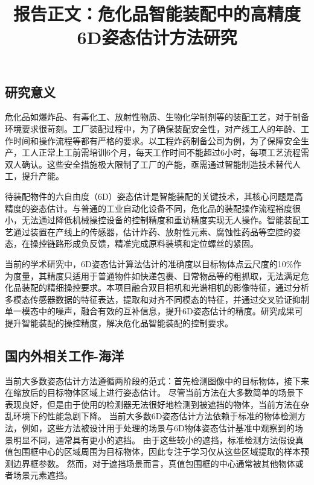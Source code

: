 \documentclass[12pt]{article}
\begin{document}

\title{报告正文：危化品智能装配中的高精度6D姿态估计方法研究}

\maketitle




\subsection{研究意义}

危化品如爆炸品、有毒化工、放射性物质、生物化学制剂等的装配工艺，对于制备环境要求很苛刻。工厂装配过程中，为了确保装配安全性，对产线工人的年龄、工作时间和操作流程等都有严格的要求。以工程炸药制备公司为例，为了保障安全生产，工人正常上工前需培训6个月，每天工作时间不能超过6小时，每项工艺流程需双人确认。这些安全措施极大限制了工厂的产能，亟需通过智能制造技术替代人工，提升产能。

待装配物件的六自由度（6D）姿态估计是智能装配的关键技术，其核心问题是高精度的姿态估计。与普通的工业自动化设备不同，危化品的装配操作流程裕度很小，无法通过降低机械操控设备的控制精度和重访精度实现无人操作。智能装配工艺通过装置在产线上的传感器，估计炸药、放射性元素、腐蚀性药品等空腔的姿态，在操控链路形成负反馈，精准完成原料装填和定位螺丝的紧固。

当前的学术研究中，6D姿态估计算法估计的准确度以目标物体点云尺度的10\%作为度量，其精度只适用于普通物件如快递包裹、日常物品等的粗抓取，无法满足危化品装配的精细操控要求。本项目融合双目相机和光谱相机的影像特征，通过分析多模态传感器数据的特征表达，提取和对齐不同模态的特征，并通过交叉验证抑制单一模态中的噪声，融合有效的互补信息，提升6D姿态估计的精度。研究成果可提升智能装配的操控精度，解决危化品智能装配的控制要求。

\subsection{国内外相关工作-海洋}
当前大多数姿态估计方法遵循两阶段的范式：首先检测图像中的目标物体，接下来在缩放后的目标物体区域上进行姿态估计。
尽管当前方法在大多数简单的场景下表现良好，但是由于使用的检测器无法很好地检测到被遮挡的物体，当前方法在杂乱环境下的性能急剧下降。
当前大多数6D姿态估计方法依赖于标准的物体检测方法，例如\cite{ATSS,fcosv1,fcosv2,PAA,faster-rcnn,maskrcnn}，这些方法被设计用于处理的场景与6D物体姿态估计基准中观察到的场景明显不同，通常具有更小的遮挡。
由于这些较小的遮挡，标准检测方法假设真值包围框中心的区域周围为目标物体，因此专注于学习仅从这些区域提取的样本预测边界框参数。
然而，对于遮挡场景而言，真值包围框的中心通常被其他物体或者场景元素遮挡。
\end{document}
